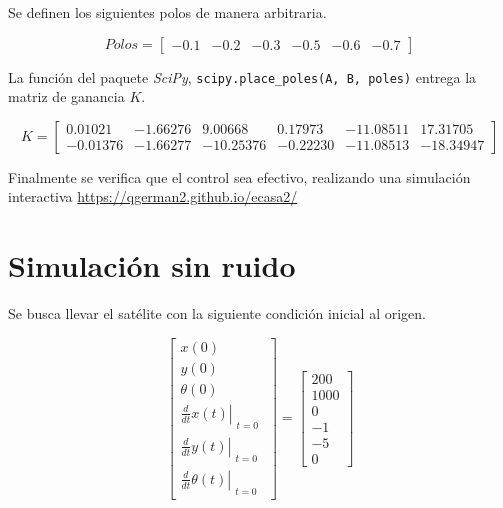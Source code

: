 \documentclass[titlepage, letterpaper]{article}
\begin{document}
Se definen los siguientes polos de manera arbitraria.

\begin{equation*}
	Polos = \left[\begin{matrix}-0.1 & -0.2 & -0.3 & -0.5 & -0.6 & -0.7\end{matrix}\right]
\end{equation*}

La función del paquete \emph{SciPy}, \texttt{scipy.place\_poles(A, B, poles)} entrega la matriz de ganancia $K$.

\begin{equation*}
	K = \left[\begin{matrix}0.01021 & -1.66276 & 9.00668 & 0.17973 & -11.08511 & 17.31705\\-0.01376 & -1.66277 & -10.25376 & -0.22230 & -11.08513 & -18.34947\end{matrix}\right]
\end{equation*}

Finalmente se verifica que el control sea efectivo, realizando una simulación interactiva \url{https://qgerman2.github.io/ecasa2/}

\section{Simulación sin ruido}

Se busca llevar el satélite con la siguiente condición inicial al origen.

\begin{equation*}\left[\begin{matrix}x{\left(0 \right)}\\y{\left(0 \right)}\\\theta{\left(0 \right)}\\\left. \frac{d}{d t} x{\left(t \right)} \right|_{\substack{ t=0 }}\\\left. \frac{d}{d t} y{\left(t \right)} \right|_{\substack{ t=0 }}\\\left. \frac{d}{d t} \theta{\left(t \right)} \right|_{\substack{ t=0 }}\end{matrix}\right] = \left[\begin{matrix}200\\1000\\0\\-1\\-5\\0\end{matrix}\right]\end{equation*}
\end{document}
